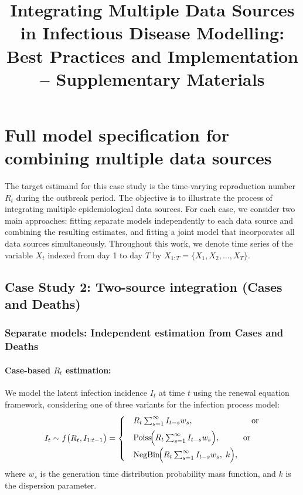 \documentclass{article}
\title{Integrating Multiple Data Sources in Infectious Disease Modelling: Best Practices and Implementation -- Supplementary Materials}
\author{}
\date{}
\newcommand{\beginsupplement}{%
        \setcounter{section}{0}
        \renewcommand{\thesection}{S\arabic{section}}%
        \setcounter{table}{0}
        \renewcommand{\thetable}{S\arabic{table}}%
        \setcounter{figure}{0}
        \renewcommand{\thefigure}{S\arabic{figure}}%
     }
\begin{document}
\maketitle

\beginsupplement

\section{Full model specification for combining multiple data sources}
The target estimand for this case study is the time-varying reproduction number $R_t$ during the outbreak period. The objective is to illustrate the process of integrating multiple epidemiological data sources. For each case, we consider two main approaches: fitting separate models independently to each data source and combining the resulting estimates, and fitting a joint model that incorporates all data sources simultaneously. Throughout this work, we denote time series of the variable $X_t$ indexed from day 1 to day $T$ by $X_{1:T} = \{X_1, X_2, \ldots, X_T\}$.


\subsection{Case Study 2: Two-source integration (Cases and Deaths)}

\subsubsection{Separate models: Independent estimation from Cases and Deaths}

\paragraph{Case-based $R_{t}$ estimation:}
We model the latent infection incidence $I_{t}$ at time $t$ using the renewal equation framework, considering one of three variants for the infection process model:
\begin{align}\label{latent_inf}
I_t \sim f\big(R_t, I_{1:t-1}\big) =
\begin{cases} 
 & R_t \sum_{s=1}^\infty I_{t-s} w_s, \hspace{2.5cm}\text{or}\\[5pt]
 & \mathrm{Poiss}\!\Big(R_t \sum_{s=1}^\infty I_{t-s} w_s\Big), \hspace{1cm}\text{or}\\[5pt]
 & \mathrm{NegBin}\!\Big(R_t \sum_{s=1}^\infty I_{t-s} w_s,\; k\Big),
\end{cases}
\end{align}
where $w_s$ is the generation time distribution probability mass function, and $k$ is the dispersion parameter.
\end{document}
